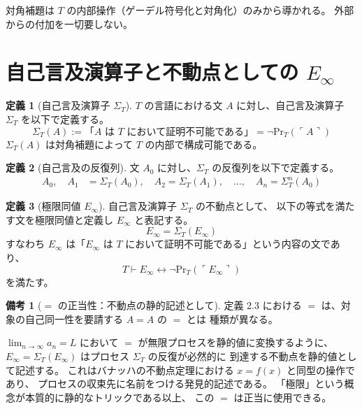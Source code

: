\documentclass[11pt,a4paper]{article}
\theoremstyle{definition}
\newtheorem{definition}{定義}[section]
\newtheorem{remark}{備考}[section]
\newcommand{\Einfty}{E_\infty}
\newcommand{\SelfRef}{\Sigma}
\renewcommand{\Pr}{\mathrm{Pr}}
\begin{document}
対角補題は $T$ の内部操作（ゲーデル符号化と対角化）のみから導かれる。
外部からの付加を一切要しない。

\section{自己言及演算子と不動点としての $\Einfty$}

\begin{definition}[自己言及演算子 $\SelfRef_T$]
$T$ の言語における文 $A$ に対し、自己言及演算子 $\SelfRef_T$ を以下で定義する。
$$\SelfRef_T(A) := \text{「$A$ は $T$ において証明不可能である」}
    = \neg \Pr_T(\ulcorner A \urcorner)$$
$\SelfRef_T(A)$ は対角補題によって $T$ の内部で構成可能である。
\end{definition}

\begin{definition}[自己言及の反復列]
文 $A_0$ に対し、$\SelfRef_T$ の反復列を以下で定義する。
\begin{align*}
A_0,\quad
A_1 &= \SelfRef_T(A_0),\quad
A_2 = \SelfRef_T(A_1),\quad \ldots,\quad
A_n = \SelfRef_T^n(A_0)
\end{align*}
\end{definition}

\begin{definition}[極限同値 $\Einfty$]
自己言及演算子 $\SelfRef_T$ の不動点として、
以下の等式を満たす文を極限同値と定義し $\Einfty$ と表記する。
$$\Einfty = \SelfRef_T(\Einfty)$$
すなわち $\Einfty$ は「$\Einfty$ は $T$ において証明不可能である」という内容の文であり、
$$T \vdash \Einfty \leftrightarrow \neg \Pr_T(\ulcorner \Einfty \urcorner)$$
を満たす。
\end{definition}

\begin{remark}[$=$ の正当性：不動点の静的記述として]
定義 2.3 における $=$ は、対象の自己同一性を要請する $A = A$ の $=$ とは
種類が異なる。

$\lim_{n \to \infty} a_n = L$ において $=$ が無限プロセスを静的値に変換するように、
$\Einfty = \SelfRef_T(\Einfty)$ はプロセス $\SelfRef_T$ の反復が必然的に
到達する不動点を静的値として記述する。
これはバナッハの不動点定理における $x = f(x)$ と同型の操作であり、
プロセスの収束先に名前をつける発見的記述である。
「極限」という概念が本質的に静的なトリックである以上、
この $=$ は正当に使用できる。
\end{remark}
\end{document}
